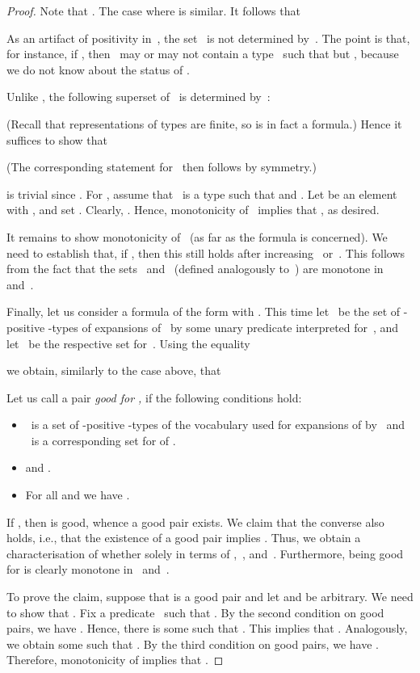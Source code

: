 \documentclass{LMCS}
\begin{document}
\begin{proof}
Note that .
The case where  is similar.
It follows that

As an artifact of positivity in~,
the set~ is not determined by~.
The point is that, for instance, if
,
then ~may or may not contain a type~
such that  but ,
because we do not know
about the status of .

Unlike , the following superset of~ is determined by~\?:

(Recall that representations of types are finite,
so  is in fact a formula.)
Hence it suffices to show that

(The corresponding statement for~ then follows by symmetry.)

 is trivial since .
For ,
assume that ~is a type such that
 and .
Let  be an element with ,
and set .
Clearly, .
Hence, monotonicity of~
implies that , as desired.

It remains to show monotonicity of~
(as far as the formula  is concerned).
We need to establish that, if ,
then this still holds after increasing ~or~.
This follows from the fact
that the sets ~and~ (defined analogously to~)
are monotone in  and~.

\smallskip
Finally, let us consider a formula of the form 
with .
This time let ~be the set of -positive -types
of expansions of~ by some unary predicate  interpreted for~,
and let ~be the respective set for~.
Using the equality

we obtain, similarly to the case above, that


Let us call a pair 
\emph{good for ,} if the following conditions hold\?:
\begin{itemize}
\item ~is a set of -positive -types
  of the vocabulary used for expansions of  by~ and
  ~is a corresponding set for of .
\item 
  and .
\item For all  and 
  we have .
\end{itemize}
If , then  is good, whence a good pair exists.
We claim that the converse also holds, i.e., that
the existence of a good pair implies .
Thus, we obtain a characterisation of whether 
solely in terms of ,~, and~.
Furthermore, being good for 
is clearly monotone in ~and~.

To prove the claim, suppose that  is a good pair
and let  and  be arbitrary.
We need to show that .
Fix a predicate~ such that .
By the second condition on good pairs, we have
.
Hence, there is some  such that .
This implies that .
Analogously, we obtain some  such that .
By the third condition on good pairs, we have .
Therefore, monotonicity of  implies that .
\end{proof}
\end{document}
